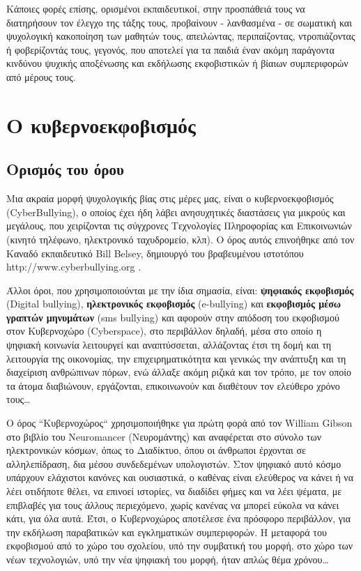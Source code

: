 \documentclass[12pt,a4paper,oneside]{book}
\begin{document}
\indent Κάποιες φορές επίσης, ορισμένοι εκπαιδευτικοί, στην προσπάθειά τους να
διατηρήσουν τον έλεγχο της τάξης τους, προβαίνουν - λανθασμένα - σε σωματική και ψυχολογική κακοποίηση των μαθητών
τους, απειλώντας, περιπαίζοντας, ντροπιάζοντας ή φοβερίζοντάς τους, γεγονός, που
αποτελεί για τα παιδιά έναν ακόμη παράγοντα κινδύνου ψυχικής αποξένωσης και
εκδήλωσης εκφοβιστικών ή βίαιων συμπεριφορών από μέρους τους.
\section*{Ο κυβερνοεκφοβισμός}
\subsection*{Oρισμός του όρου}
\indent Μια ακραία μορφή ψυχολογικής βίας στις μέρες μας, είναι ο
κυβερνοεκφοβισμός (CyberBullying), ο οποίος έχει ήδη λάβει ανησυχητικές διαστάσεις για μικρούς και μεγάλους, που χειρίζονται τις σύγχρονες
Τεχνολογίες Πληροφορίας και Επικοινωνιών (κινητό τηλέφωνο, ηλεκτρονικό
ταχυδρομείο, κλπ). Ο όρος αυτός επινοήθηκε από τον Καναδό εκπαιδευτικό Bill
Belsey, δημιουργό του βραβευμένου ιστοτόπου http://www.cyberbullying.org .

\indent Άλλοι όροι, που χρησιμοποιούνται με την ίδια σημασία, είναι:
\textbf{ψηφιακός εκφοβισμός} (Digital bullying), \textbf{ηλεκτρονικός εκφοβισμός} (e-bullying) και \textbf{εκφοβισμός μέσω γραπτών μηνυμάτων} (sms bullying) και αφορούν στην απόδοση του εκφοβισμού στον
Κυβερνοχώρο (Cyberspace), στο περιβάλλον δηλαδή, μέσα στο οποίο η ψηφιακή κοινωνία λειτουργεί και αναπτύσσεται, αλλάζοντας έτσι τη δομή και τη λειτουργία της οικονομίας, την επιχειρηματικότητα και γενικώς την ανάπτυξη και τη
διαχείριση ανθρώπινων πόρων, ενώ άλλαξε ακόμη ριζικά και τον τρόπο, με τον οποίο
τα άτομα διαβιώνουν, εργάζονται, επικοινωνούν και διαθέτουν τον ελεύθερο χρόνο
τους\ldots

\indent Ο όρος ``Κυβερνοχώρος`` χρησιμοποιήθηκε για πρώτη φορά από τον William
Gibson στο βιβλίο του Neuromancer (Νευρομάντης) και αναφέρεται στο σύνολο των ηλεκτρονικών κόσμων, όπως το Διαδίκτυο, όπου οι
άνθρωποι έρχονται σε αλληλεπίδραση, δια μέσου συνδεδεμένων υπολογιστών. Στον
ψηφιακό αυτό κόσμο υπάρχουν ελάχιστοι κανόνες και ουσιαστικά, ο καθένας είναι
ελεύθερος να κάνει ή να λέει οτιδήποτε θέλει, να επινοεί ιστορίες, να διαδίδει
φήμες και να λέει ψέματα, με επιβλαβές για τους άλλους περιεχόμενο, χωρίς
κανένας να μπορεί εύκολα να κάνει κάτι, για όλα αυτά. Έτσι, ο Κυβερνοχώρος
αποτέλεσε ένα πρόσφορο περιβάλλον, για την εκδήλωση παραβατικών και εγκληματικών
συμπεριφορών. Η μεταφορά του εκφοβισμού από το χώρο του σχολείου, υπό την
συμβατική του μορφή, στο χώρο των νέων τεχνολογιών, υπό την νέα ψηφιακή του
μορφή, ήταν απλώς θέμα χρόνου\ldots
\end{document}
